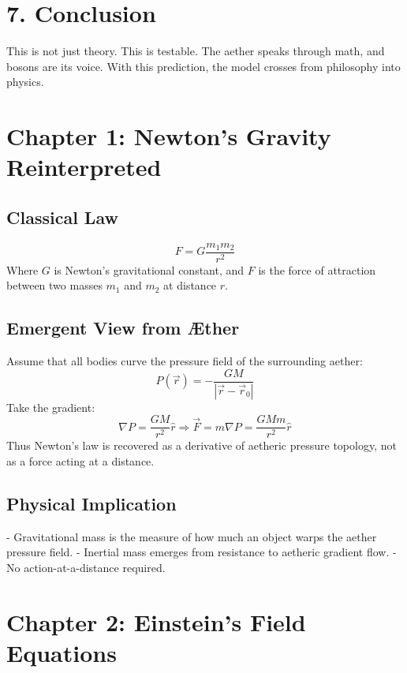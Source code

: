 \documentclass[12pt]{book}
\begin{document}
\section*{7. Conclusion}

This is not just theory. This is testable. The aether speaks through math, and bosons are its voice. With this prediction, the model crosses from philosophy into physics.





\maketitle

\section*{Chapter 1: Newton’s Gravity Reinterpreted}

\subsection*{Classical Law}
\[
F = G \frac{m_1 m_2}{r^2}
\]
Where $G$ is Newton’s gravitational constant, and $F$ is the force of attraction between two masses $m_1$ and $m_2$ at distance $r$.

\subsection*{Emergent View from Æther}
Assume that all bodies curve the pressure field of the surrounding aether:
\[
P(\vec{r}) = -\frac{G M}{|\vec{r} - \vec{r}_0|}
\]
Take the gradient:
\[
\nabla P = \frac{G M}{r^2} \hat{r}
\Rightarrow \vec{F} = m \nabla P = \frac{G M m}{r^2} \hat{r}
\]
Thus Newton’s law is recovered as a derivative of aetheric pressure topology, not as a force acting at a distance.

\subsection*{Physical Implication}
- Gravitational mass is the measure of how much an object warps the aether pressure field.
- Inertial mass emerges from resistance to aetheric gradient flow.
- No action-at-a-distance required.

\section*{Chapter 2: Einstein’s Field Equations}
\end{document}
